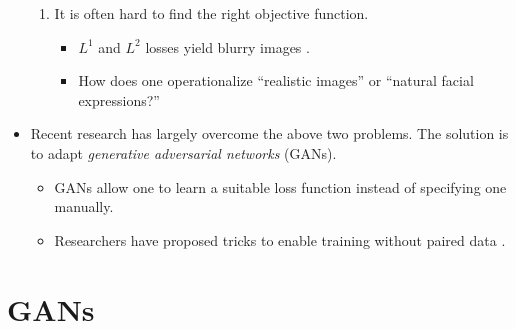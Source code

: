 \documentclass[10pt]{article}
\begin{document}
\begin{itemize}
\begin{enumerate}
  		\item It is often hard to find the right objective function.
  		\begin{itemize}
  			\item $L^1$ and $L^2$ losses yield blurry images \cite{Isola:2016}.

  			\item How does one operationalize ``realistic images'' or ``natural facial expressions?''
  		\end{itemize}
  	\end{enumerate}

  	\item Recent research has largely overcome the above two problems. The solution is to adapt \emph{generative adversarial networks} (GANs).

  	\begin{itemize}
  		\item GANs allow one to learn a suitable loss function instead of specifying one manually.
  		\item Researchers have proposed tricks to enable training without paired data \cite{Zhu:2017, Choi:2017}.
  	\end{itemize}
  \end{itemize}

  \section{GANs}
  
\end{document}
